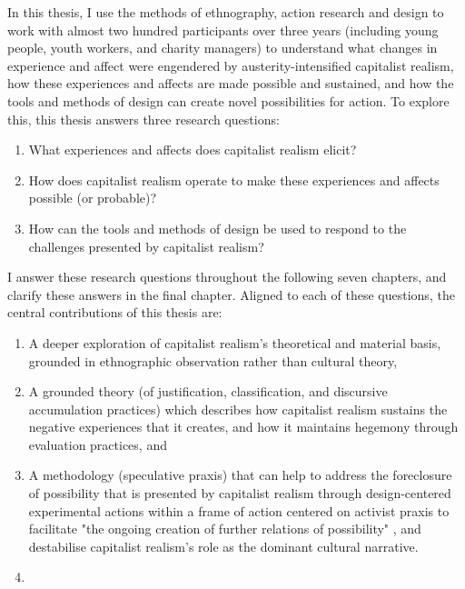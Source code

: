 In this thesis, I use the methods of ethnography, action research and design to work with almost two hundred participants over three years (including young people, youth workers, and charity managers) to understand what changes in experience and affect were engendered by austerity-intensified capitalist realism, how these experiences and affects are made possible and sustained, and how the tools and methods of design can create novel possibilities for action. To explore this, this thesis answers three research questions: 
\begin{enumerate}
    \item What experiences and affects does capitalist realism elicit?
    \item How does capitalist realism operate to make these experiences and affects possible (or probable)?
    \item How can the tools and methods of design be used to respond to the challenges presented by capitalist realism?
\end{enumerate}
I answer these research questions throughout the following seven chapters, and clarify these answers in the final chapter. Aligned to each of these questions, the central contributions of this thesis are:
\begin{enumerate}
    \item A deeper exploration of capitalist realism's theoretical and material basis, grounded in ethnographic observation rather than cultural theory,
    \item A grounded theory (of justification, classification, and discursive accumulation practices) which describes how capitalist realism sustains the negative experiences that it creates, and how it maintains hegemony through evaluation practices, and
    \item A methodology (speculative praxis) that can help to address the foreclosure of possibility that is presented by capitalist realism through design-centered experimental actions within a frame of action centered on activist praxis to facilitate "the ongoing creation of further relations of possibility" \citep{harrison_future_2020}, and destabilise capitalist realism's role as the dominant cultural narrative. 
    \item \end{enumerate}

